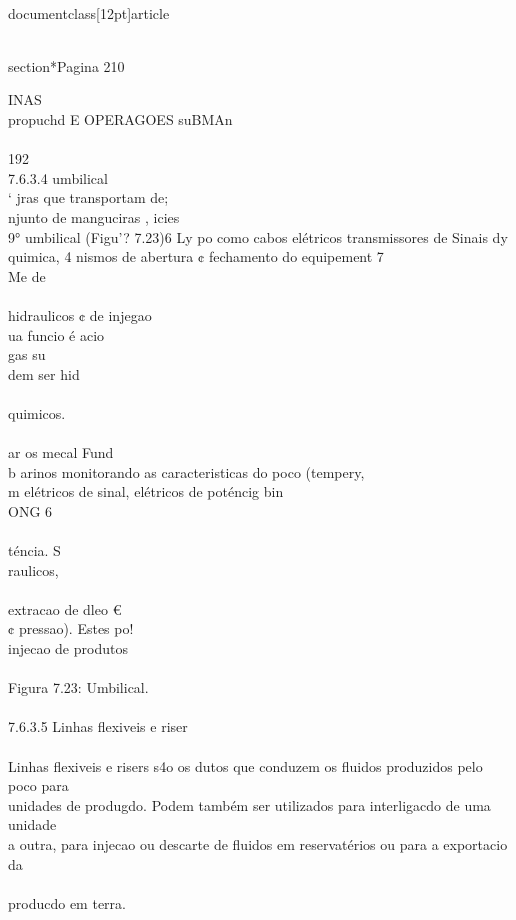 \\documentclass[12pt]{article}
\begin{document}
\\section*{Pagina 210}

INAS\\
propuchd E OPERAGOES suBMAn\\
\\
192\\
7.6.3.4 umbilical\\
‘ jras que transportam de;\\
njunto de manguciras , icies\\
9° umbilical (Figu’? 7.23)6 Ly po como cabos elétricos transmissores de Sinais dy\\
quimica, 4 nismos de abertura ¢ fechamento do equipement 7\\
Me de\\
\\
hidraulicos ¢ de injegao\\
ua funcio é acio\\
gas su\\
dem ser hid\\
\\
quimicos.\\
\\
ar os mecal Fund\\
b arinos monitorando as caracteristicas do poco (tempery,\\
m elétricos de sinal, elétricos de poténcig bin\\
ONG 6\\
\\
téncia. S\\
raulicos,\\
\\
extracao de dleo €\\
¢ pressao). Estes po!\\
injecao de produtos\\
\\
Figura 7.23: Umbilical.\\
\\
7.6.3.5 Linhas flexiveis e riser\\
\\
Linhas flexiveis e risers s4o os dutos que conduzem os fluidos produzidos pelo poco para\\
unidades de produgdo. Podem também ser utilizados para interligacdo de uma unidade\\
a outra, para injecao ou descarte de fluidos em reservatérios ou para a exportacio da\\
\\
producdo em terra.\\
\end{document}

